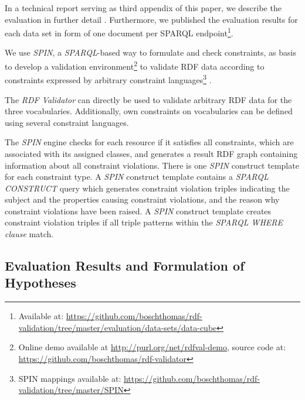\documentclass{llncs}
\begin{document}
In a technical report serving as third appendix of this paper, we describe the evaluation in further detail \cite{BoschZapilkoWackerowEckert2015-2}. Furthermore, we published the evaluation results for each data set in form of one document per SPARQL endpoint\footnote{Available at: \url{https://github.com/boschthomas/rdf-validation/tree/master/evaluation/data-sets/data-cube}}.

We use \emph{SPIN}, 
a \emph{SPARQL}-based way to formulate and check constraints, as basis to develop a
validation environment\footnote{Online demo available at \url{http://purl.org/net/rdfval-demo}, source code at: \url{https://github.com/boschthomas/rdf-validator}} to validate RDF data according to constraints expressed by arbitrary constraint languages\footnote{SPIN mappings available at: \url{https://github.com/boschthomas/rdf-validation/tree/master/SPIN}} \cite{BoschEckert2014-2}.

The \emph{RDF Validator} can directly be used to validate arbitrary RDF data for the three vocabularies. Additionally, own constraints on vocabularies can be defined using several constraint languages.

The \emph{SPIN} engine checks for each resource if it satisfies all constraints, which are associated with its assigned classes, and generates a result RDF graph containing information about all constraint violations.
There is one \emph{SPIN} construct template for each constraint type.
A \emph{SPIN} construct template contains a \emph{SPARQL CONSTRUCT} query which generates constraint violation triples indicating the subject and the properties causing constraint violations, and the reason why constraint violations have been raised.
A \emph{SPIN} construct template creates constraint violation triples if all triple patterns within the \emph{SPARQL WHERE clause} match.

\subsection{Evaluation Results and Formulation of Hypotheses}
\end{document}
